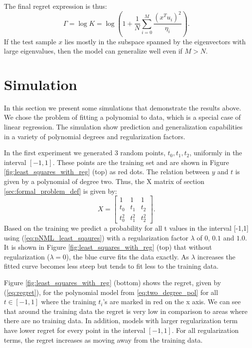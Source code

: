 \documentclass[conference,letterpaper]{IEEEtran}
\begin{document}
The final regret expression is thus:
\begin{equation}
\Gamma = \log K = \log \left(1 + \frac{1}{N} \sum_{i=0}^{M} \frac{\left(x^Tu_i\right)^2 }{\eta_i}\right).
\end{equation}
If the test sample $x$ lies mostly in the subspace spanned by the eigenvectors with large eigenvalues, then the model can generalize well even if $M>N$.

\section{Simulation} \label{sec:simulation}
In this section we present some simulations that demonstrate the results above. We chose the problem of fitting a polynomial to data, which is a special case of linear regression.
The simulation show prediction and generalization capabilities in a variety of polynomial degrees and regularization factors.

In the first experiment we generated 3 random points, $t_0,t_1,t_2$, uniformly in the interval $[-1, 1]$. These points are the training set and are shown in Figure \ref{fig:least_squares_with_reg} (top) as red dots. 
The relation between $y$ and $t$ is given by a polynomial of degree two.
Thus, the X matrix of section \ref{sec:formal_problem_def} is given by:
\begin{equation} \label{eq:two_degree_pol}
X = 
\begin{bmatrix}
1 & 1 & 1 \\
t_0 & t_1 & t_2 \\
t_0^2 & t_1^2 & t_2^2 
\end{bmatrix}.
\end{equation}
Based on the training we predict a probability for all t values in the interval [-1,1] using (\ref{eq:pNML_least_sqaures}) with a regularization factor $\lambda$ of $0$, $0.1$ and $1.0$. 
It is shown in Figure \ref{fig:least_squares_with_reg} (top) that without regularization ($\lambda=0$), the blue curve fits the data exactly. As $\lambda$ increases the fitted curve becomes less steep but tends to fit less to the training data.

Figure \ref{fig:least_squares_with_reg} (bottom) shows the regret, given by (\ref{eq:regret}), for the polynomial model from \eqref{eq:two_degree_pol} for all $t\in[-1,1]$ where the training $t_i$'s are marked in red on the x axis. 
We can see that around the training data the regret is very low in comparison to areas where there are no training data. 
In addition, models with larger regularization term have lower regret for every point in the interval $[-1,1]$.
For all regularization terms, the regret increases as moving away from the training data.
\end{document}
